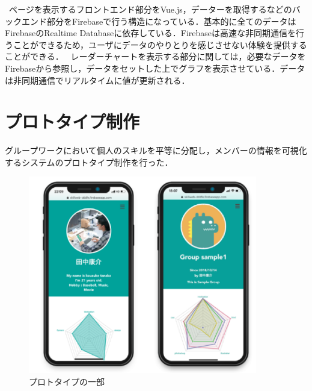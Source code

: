 \documentclass{funthesis}
\begin{document}
\ ページを表示するフロントエンド部分をVue.js，データーを取得するなどのバックエンド部分をFirebaseで行う構造になっている．基本的に全てのデータはFirebaseのRealtime Databaseに依存している．Firebaseは高速な非同期通信を行うことができるため，ユーザにデータのやりとりを感じさせない体験を提供することができる．
\ レーダーチャートを表示する部分に関しては，必要なデータをFirebaseから参照し，データをセットした上でグラフを表示させている．データは非同期通信でリアルタイムに値が更新される．


\section{プロトタイプ制作}

グループワークにおいて個人のスキルを平等に分配し，メンバーの情報を可視化するシステムのプロトタイプ制作を行った．
\begin{figure}[h]
 \centering
   \includegraphics[width=100mm]{figures/gamen.png}
 \caption{プロトタイプの一部}
 \label{gamen}
\end{figure}
\end{document}
